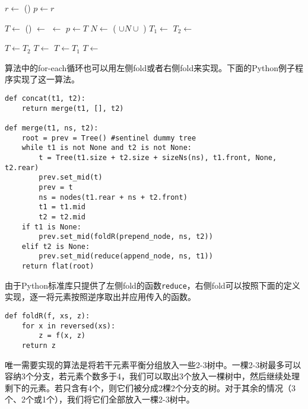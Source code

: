 \documentclass[UTF8]{article}
\begin{document}
\begin{algorithmic}
  \State \Return {}
\EndFunction
\Statex
{}
  \State $r \gets$ ()
  \State $p \gets r$

    \State $T \gets$ ()
    \State {} $\gets$ 
    \State {} $\gets$ 
    \State {}
    \State $p \gets T$
    \State $N \gets$ ( $\cup N \cup$ )
    \State $T_1 \gets$ 
    \State $T_2 \gets$ 
  \EndWhile

    \State $T \gets T_2$
      \State $T \gets$ 
    \EndFor
    \State $T \gets T_1$
      \State $T \gets$ 
    \EndFor
  \EndIf
  \State {}

  \State \Return {}
\EndFunction
\end{algorithmic}

算法中的for-each循环也可以用左侧fold或者右侧fold来实现。下面的Python例子程序实现了这一算法。

\lstset{language=Python}
\begin{lstlisting}
def concat(t1, t2):
    return merge(t1, [], t2)

def merge(t1, ns, t2):
    root = prev = Tree() #sentinel dummy tree
    while t1 is not None and t2 is not None:
        t = Tree(t1.size + t2.size + sizeNs(ns), t1.front, None, t2.rear)
        prev.set_mid(t)
        prev = t
        ns = nodes(t1.rear + ns + t2.front)
        t1 = t1.mid
        t2 = t2.mid
    if t1 is None:
        prev.set_mid(foldR(prepend_node, ns, t2))
    elif t2 is None:
        prev.set_mid(reduce(append_node, ns, t1))
    return flat(root)
\end{lstlisting}

由于Python标准库只提供了左侧fold的函数\texttt{reduce}，右侧fold可以按照下面的定义实现，逐一将元素按照逆序取出并应用传入的函数。

\begin{lstlisting}
def foldR(f, xs, z):
    for x in reversed(xs):
        z = f(x, z)
    return z
\end{lstlisting}

唯一需要实现的算法是将若干元素平衡分组放入一些2-3树中。一棵2-3树最多可以容纳3个分支，若元素个数多于4，我们可以取出3个放入一棵树中，然后继续处理剩下的元素。若只含有4个，则它们被分成2棵2个分支的树。对于其余的情况（3个、2个或1个），我们将它们全部放入一棵2-3树中。
\end{document}
